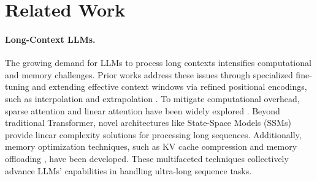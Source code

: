 \section{Related Work}


\paragraph{Long-Context LLMs.} The growing demand for LLMs to process long contexts intensifies computational and memory challenges. Prior works address these issues through specialized fine-tuning \citep{longlora} and extending effective context windows via refined positional encodings, such as interpolation and extrapolation \citep{Interpolation,ntk}. To mitigate computational overhead, sparse attention and linear attention have been widely explored \citep{reformer,longformer,linformer}. Beyond traditional Transformer, novel architectures like State-Space Models (SSMs) \citep{longmamba,SSMs} provide linear complexity solutions for processing long sequences. Additionally, memory optimization techniques, such as KV cache compression \citep{streamingllm,snapkv} and memory offloading \citep{hcattention,deepspeed}, have been developed. These multifaceted techniques collectively advance LLMs' capabilities in handling ultra-long sequence tasks.




